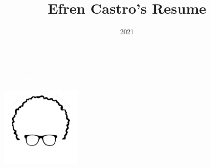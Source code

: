 \documentclass[11pt,oneside,a4paper,titlepage]{article}
\title{Efren Castro's Resume}
\date{2021}
\begin{document}

\begin{tcolorbox}
  \begin{minipage}{15cm}
    \huge{\textcolor{white}{\scshape{Efren Castro}}}\\
    \normalsize{\textcolor{white}{\scshape{Full Stack Web Developer}}}
  \end{minipage}
  \begin{minipage}{4.5cm}
    \includegraphics[width=4cm,trim=-3cm 5cm 3cm 0]{Logo.png}
  \end{minipage}
\end{tcolorbox}
\end{document}
